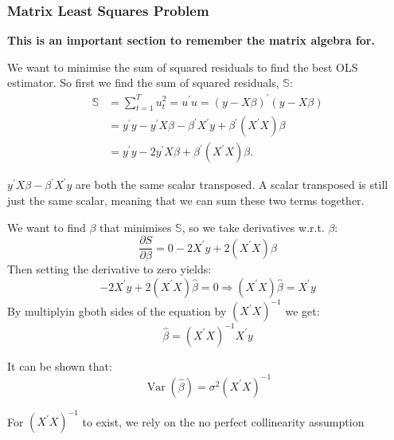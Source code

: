 \documentclass[11pt]{article}
\begin{document}
\subsubsection{Matrix Least Squares Problem}
\textbf{This is an important section to remember the matrix algebra for.}

\begin{mdframed}
We want to minimise the sum of squared residuals to find the best OLS estimator. So first we find the sum of squared residuals, $\mathbb{S}$:
\begin{equation}
\begin{aligned}
\mathbb{S} & =\sum_{t=1}^T u_t^2=u^{\prime} u=(y-X \beta)^{\prime}(y-X \beta) \\
& =y^{\prime} y-y^{\prime} X \beta-\beta^{\prime} X^{\prime} y+\beta^{\prime}\left(X^{\prime} X\right) \beta \\
& =y^{\prime} y-2 y^{\prime} X \beta+\beta^{\prime}\left(X^{\prime} X\right) \beta .
\end{aligned}
\end{equation}
\begin{note}
    $y^{\prime}X\beta - \beta^{\prime}X^{\prime}y$ are both the same scalar transposed. A scalar transposed is still just the same scalar, meaning that we can sum these two terms together.
\end{note}

We want to find $\beta$ that minimises $\mathbb{S}$, so we take derivatives w.r.t. $\beta$:
\begin{equation}
\frac{\partial S}{\partial \beta}=0-2 X^{\prime} y+2\left(X^{\prime} X\right) \beta
\end{equation}
Then setting the derivative to zero yields:
\begin{equation}
-2 X^{\prime} y+2\left(X^{\prime} X\right) \widehat{\beta}=0 \Rightarrow\left(X^{\prime} X\right) \widehat{\beta}=X^{\prime} y
\end{equation}
By multiplyin gboth sides of the equation by $(X^\prime X)^{-1}$ we get:
\[\hat{\beta} = (X^\prime X)^{-1}X^\prime y\]

It can be shown that:
\begin{equation}
\operatorname{Var}(\widehat{\beta})=\sigma^2\left(X^{\prime} X\right)^{-1}
\end{equation}
\end{mdframed}

\begin{note}
    For $\left(X^{\prime} X\right)^{-1}$ to exist, we rely on the no perfect collinearity assumption
\end{note}
\end{document}
